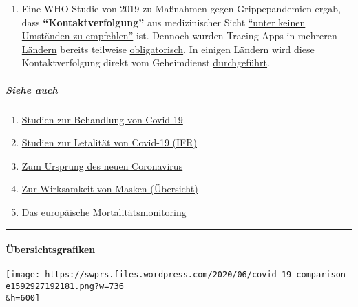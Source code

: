 \begin{enumerate}
{  Drohnen} und zu teilweise massiver Polizeigewalt.
\item
  Eine WHO-Studie von 2019 zu Maßnahmen gegen Grippepandemien ergab,
  dass \textbf{``Kontakt­verfolgung''} aus medizinischer Sicht
  \href{https://apps.who.int/iris/bitstream/handle/10665/329438/9789241516839-eng.pdf\#page=9}{``unter
  keinen Umständen zu empfehlen''} ist. Dennoch wurden Tracing-Apps in
  mehreren
  \href{https://www.heise.de/tp/features/CuidAR-Argentinien-ueberwacht-mit-einer-App-4720143.html}{Ländern}
  bereits teilweise
  \href{https://www.technologyreview.com/2020/05/07/1001360/india-aarogya-setu-covid-app-mandatory/}{obligatorisch}.
  In einigen Ländern wird diese Kontakt­ver­folgung direkt vom
  Geheimdienst
  \href{https://www.jewishpress.com/news/the-courts/state-to-high-court-even-more-shin-bet-involvement-in-fighting-the-coronavirus/2020/04/14/}{durchgeführt}.
\end{enumerate}

\hypertarget{siehe-auch}{%
\subparagraph{\texorpdfstring{\textbf{Siehe
auch}}{Siehe auch}}\label{siehe-auch}}

\begin{enumerate}
\def\labelenumi{\arabic{enumi}.}
\tightlist
\item
  \href{https://swprs.org/zur-behandlung-von-covid-19/}{Studien zur
  Behandlung von Covid-19}
\item
  \href{https://swprs.org/studies-on-covid-19-lethality/}{Studien zur
  Letalität von Covid-19 (IFR)}
\item
  \href{https://swprs.org/ursprung-des-covid-19-virus-die-mojiang-minenarbeiter-hypothese/}{Zum
  Ursprung des neuen Coronavirus}
\item
  \href{https://swprs.org/face-masks-evidence/}{Zur Wirksamkeit von
  Masken (Übersicht)}
\item
  \href{https://euromomo.eu}{Das europäische Mortalitätsmonitoring}
\end{enumerate}

\begin{center}\rule{0.5\linewidth}{\linethickness}\end{center}

\hypertarget{uxfcbersichtsgrafiken}{%
\paragraph{Übersichtsgrafiken}\label{uxfcbersichtsgrafiken}}

\texttt{[image: https://swprs.files.wordpress.com/2020/06/covid-19-comparison-e1592927192181.png?w=736\\\&h=600]}

